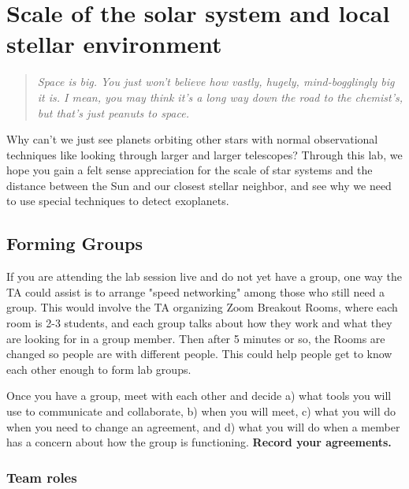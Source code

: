 \chapter{Scale of the solar system and local stellar environment}

\begin{quotation}
	\textit{Space is big. You just won't believe how vastly, hugely, mind-bogglingly big it is. I mean, you may think it's a long way down the road to the chemist's, but that's just peanuts to space.} 
\end{quotation}

Why can't we just see planets orbiting other stars with normal observational techniques like looking through larger and larger telescopes? Through this lab, we hope you gain a felt sense appreciation for the scale of star systems and the distance between the Sun and our closest stellar neighbor, and see why we need to use special techniques to detect exoplanets.

\section{Forming Groups}

If you are attending the lab session live and do not yet have a group, one way the TA could assist is to arrange "speed networking" among those who still need a group. This would involve the TA organizing Zoom Breakout Rooms, where each room is 2-3 students, and each group talks about how they work and what they are looking for in a group member. Then after 5 minutes or so, the Rooms are changed so people are with different people. This could help people get to know each other enough to form lab groups.

\begin{steps}
	\item Once you have a group, meet with each other and decide a) what tools you will use to communicate and collaborate, b) when you will meet, c) what you will do when you need to change an agreement, and d) what you will do when a member has a concern about how the group is functioning. \textbf{Record your agreements.}%
\end{steps}

\subsection{Team roles}

